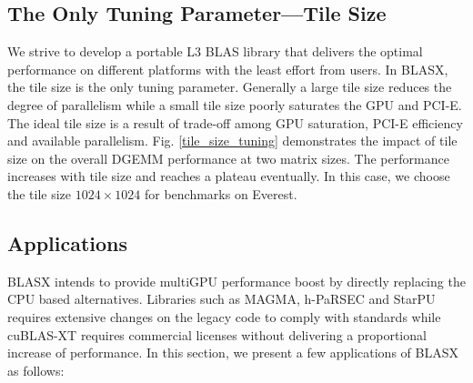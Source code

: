 \documentclass[conference]{IEEEtran}
\begin{document}
\vspace{-0.12in}
\subsection{The Only Tuning Parameter---Tile Size}
\vspace{-0.05in}

We strive to develop a portable L3 BLAS library that delivers the optimal performance on different platforms 
with the least effort from users. In BLASX, the tile size is the only tuning parameter. Generally a large tile 
size reduces the degree of parallelism while a small tile size poorly saturates the GPU and PCI-E. The ideal 
tile size is a result of trade-off among GPU saturation, PCI-E efficiency and available parallelism. 
Fig. \ref{tile_size_tuning} demonstrates the impact of tile size on the overall DGEMM performance at 
two matrix sizes. The performance increases with tile size and reaches a plateau eventually. In this case, 
we choose the tile size $1024\times1024$ for benchmarks on Everest.

\vspace{-0.12in}
\subsection{Applications}
\vspace{-0.05in}

BLASX intends to provide multiGPU performance boost by directly replacing the CPU based 
alternatives. Libraries such as MAGMA, h-PaRSEC and StarPU requires extensive changes on 
the legacy code to comply with standards while cuBLAS-XT requires commercial licenses without
delivering a proportional increase of performance. In this section, we present a few applications of BLASX as follows:
\end{document}
